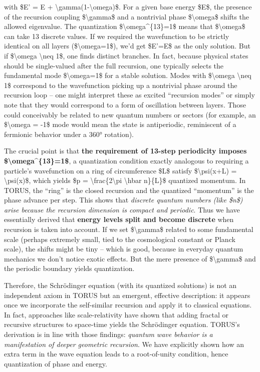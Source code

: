 \documentclass[]{article}
\begin{document}
with \$E' = E + \textbackslash{}gamma(1-\textbackslash{}omega)\$​. For a
given base energy \$E\$, the presence of the recursion coupling
\$\textbackslash{}gamma\$ and a nontrivial phase
\$\textbackslash{}omega\$ shifts the allowed eigenvalue. The
quantization \$\textbackslash{}omega\^{}\{13\}=1\$ means that
\$\textbackslash{}omega\$ can take 13 discrete values. If we required
the wavefunction to be strictly identical on all layers
(\$\textbackslash{}omega=1\$), we'd get \$E'=E\$ as the only solution.
But if \$\textbackslash{}omega \textbackslash{}neq 1\$, one finds
distinct branches. In fact, because physical states should be
single-valued after the full recursion, one typically selects the
fundamental mode \$\textbackslash{}omega=1\$ for a stable solution​.
Modes with \$\textbackslash{}omega \textbackslash{}neq 1\$ correspond to
the wavefunction picking up a nontrivial phase around the recursion loop
-- one might interpret these as excited ``recursion modes'' or simply
note that they would correspond to a form of oscillation between
layers​. Those could conceivably be related to new quantum numbers or
sectors (for example, an \$\textbackslash{}omega = -1\$ mode would mean
the state is antiperiodic, reminiscent of a fermionic behavior under a
360° rotation).

The crucial point is that \textbf{the requirement of 13-step periodicity
imposes \$\textbackslash{}omega\^{}\{13\}=1\$}, a quantization condition
exactly analogous to requiring a particle's wavefunction on a ring of
circumference \$L\$ satisfy \$\textbackslash{}psi(x+L) =
\textbackslash{}psi(x)\$, which yields \$p =
\textbackslash{}frac\{2\textbackslash{}pi \textbackslash{}hbar
n\}\{L\}\$ quantized momentum​. In TORUS, the ``ring'' is the closed
recursion and the quantized ``momentum'' is the phase advance per step.
This shows that \emph{discrete quantum numbers (like \$n\$) arise
because the recursion dimension is compact and periodic}. Thus we have
essentially derived that \textbf{energy levels split and become
discrete} when recursion is taken into account​. If we set
\$\textbackslash{}gamma\$ related to some fundamental scale (perhaps
extremely small, tied to the cosmological constant or Planck scale), the
shifts might be tiny -- which is good, because in everyday quantum
mechanics we don't notice exotic effects. But the mere presence of
\$\textbackslash{}gamma\$ and the periodic boundary yields quantization.

Therefore, the Schrödinger equation (with its quantized solutions) is
not an independent axiom in TORUS but an emergent, effective
description: it appears once we incorporate the self-similar recursion
and apply it to classical equations​. In fact, approaches like
scale-relativity have shown that adding fractal or recursive structures
to space-time yields the Schrödinger equation​. TORUS's derivation is in
line with those findings: \emph{quantum wave behavior is a manifestation
of deeper geometric recursion}. We have explicitly shown how an extra
term in the wave equation leads to a root-of-unity condition, hence
quantization of phase and energy.
\end{document}
